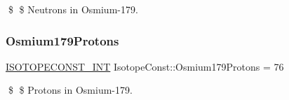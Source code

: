 \$ \$ Neutrons in Osmium-\/179. \mbox{\label{group___isotope_const-_osmium-_os179_gaaef6a4e4759e2fff9088199f24a255cc}} 
\subsubsection{\texorpdfstring{Osmium179\+Protons}{Osmium179Protons}}
{\footnotesize\ttfamily \mbox{\hyperlink{group___isotope_const-_macros_ga5f18360b3e99483a35c32d789e62621c}{I\+S\+O\+T\+O\+P\+E\+C\+O\+N\+S\+T\+\_\+\+I\+NT}} Isotope\+Const\+::\+Osmium179\+Protons = 76}

\$ \$ Protons in Osmium-\/179. 
